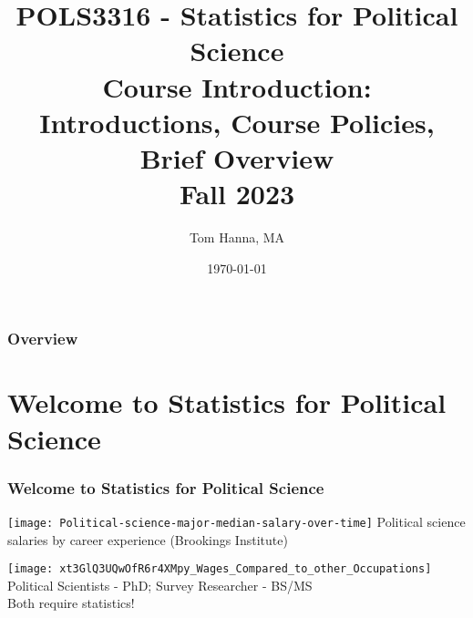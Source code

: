 \documentclass{beamer}
\title[POLS3316: Course Introduction]{POLS3316 - Statistics for Political Science \\ Course Introduction: Introductions, Course Policies, Brief Overview \\ Fall 2023} %
\author{Tom Hanna, MA} %
\institute[University of Houston] %
{
University of Houston \\ %
\medskip
\textit{tlhanna@uh.edu} %
}
\date{\today} %
\begin{document}
\begin{frame}

\titlepage %

\end{frame}



\begin{frame}

\frametitle{Overview} %

\tableofcontents %

\end{frame}






\section{Welcome to Statistics for Political Science} %


\begin{frame}
\frametitle{Welcome to Statistics for Political Science}

\centering
\texttt{[image: Political-science-major-median-salary-over-time]}
Political science salaries by career experience (Brookings Institute)


\end{frame}

\begin{frame}

\centering
\texttt{[image: xt3GlQ3UQwOfR6r4XMpy\_Wages\_Compared\_to\_other\_Occupations]}\\
Political Scientists - PhD; Survey Researcher - BS/MS\\
Both require statistics!


\end{frame}
\end{document}
